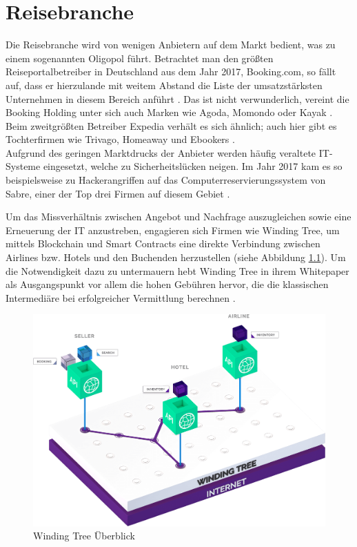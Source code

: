 \chapter{Reisebranche}
\label{chap:Reisebranche}
Die Reisebranche wird von wenigen Anbietern auf dem Markt bedient, was zu einem sogenannten Oligopol führt. Betrachtet man den größten Reiseportalbetreiber in Deutschland aus dem Jahr 2017, Booking.com, so fällt auf, dass er hierzulande mit weitem Abstand die Liste der umsatzstärksten Unternehmen in diesem Bereich anführt \cite[vgl.][]{FVW2017}. Das ist nicht verwunderlich, vereint die Booking Holding unter sich auch Marken wie Agoda, Momondo oder Kayak \cite[vgl.][]{Booking2019}. Beim zweitgrößten Betreiber Expedia verhält es sich ähnlich; auch hier gibt es Tochterfirmen wie Trivago, Homeaway und Ebookers \cite[vgl.][]{Expedia2019}.\\
Aufgrund des geringen Marktdrucks der Anbieter werden häufig veraltete IT-Systeme eingesetzt, welche zu Sicherheitslücken neigen. Im Jahr 2017 kam es so beispielsweise zu Hackerangriffen auf das Computerreservierungssystem von Sabre, einer der Top drei Firmen auf diesem Gebiet \cite[vgl.][]{Mathews2017}.

Um das Missverhältnis zwischen Angebot und Nachfrage auszugleichen sowie eine Erneuerung der IT anzustreben, engagieren sich Firmen wie Winding Tree, um mittels Blockchain und Smart Contracts eine direkte Verbindung zwischen Airlines bzw. Hotels und den Buchenden herzustellen (siehe Abbildung \ref{fig:windingTreeOverview}). Um die Notwendigkeit dazu zu untermauern hebt Winding Tree in ihrem Whitepaper als Ausgangspunkt vor allem die hohen Gebühren hervor, die die klassischen Intermediäre bei erfolgreicher Vermittlung berechnen \cite[vgl.][S. 2 f.]{WT2019}.

\begin{figure}[h!]
  \centering
  \includegraphics[width=\textwidth]{Bilder/WindingTreeOverview.png}
  \caption[Winding Tree Überblick]{Winding Tree Überblick \cite{WTWebsite2019}}
  \label{fig:windingTreeOverview}
\end{figure}

